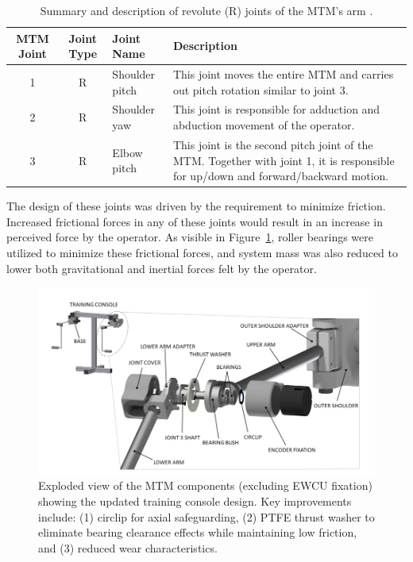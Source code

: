 \begin{table}[h]
\centering
\caption{Summary and description of revolute (R) joints of the MTM's arm \cite{ref19,ref20}.}
\label{tab:mtm_joints}
\begin{tabular}{|c|c|l|p{8cm}|}
\hline
\textbf{MTM Joint} & \textbf{Joint Type} & \textbf{Joint Name} & \textbf{Description} \\
\hline
1 & R & Shoulder pitch & This joint moves the entire MTM and carries out pitch rotation similar to joint 3. \\
\hline
2 & R & Shoulder yaw & This joint is responsible for adduction and abduction movement of the operator. \\
\hline
3 & R & Elbow pitch & This joint is the second pitch joint of the MTM. Together with joint 1, it is responsible for up/down and forward/backward motion. \\
\hline
\end{tabular}
\end{table}

The design of these joints was driven by the requirement to minimize friction. Increased frictional forces in any of these joints would result in an increase in perceived force by the operator. As visible in Figure~\ref{fig:mtm_detailed}, roller bearings were utilized to minimize these frictional forces, and system mass was also reduced to lower both gravitational and inertial forces felt by the operator.

\begin{figure}[h]
    \centering
    \includegraphics[width=0.75\linewidth]{figures/mtm_detailed.png}
    \caption{Exploded view of the MTM components (excluding EWCU fixation) showing the updated training console design. Key improvements include: (1) circlip for axial safeguarding, (2) PTFE thrust washer to eliminate bearing clearance effects while maintaining low friction, and (3) reduced wear characteristics.}
    \label{fig:mtm_detailed}
\end{figure}


